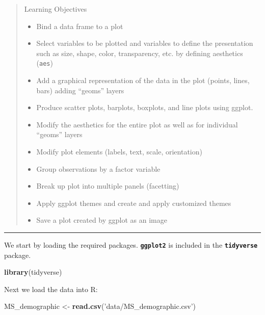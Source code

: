 \documentclass[]{book}
\newenvironment{Shaded}{\begin{snugshade}}{\end{snugshade}}
\newcommand{\KeywordTok}[1]{\textcolor[rgb]{0.13,0.29,0.53}{\textbf{#1}}}
\newcommand{\StringTok}[1]{\textcolor[rgb]{0.31,0.60,0.02}{#1}}
\newcommand{\NormalTok}[1]{#1}
\providecommand{\tightlist}{%
  \setlength{\itemsep}{0pt}\setlength{\parskip}{0pt}}
\theoremstyle{definition}
\theoremstyle{definition}
\theoremstyle{definition}
\theoremstyle{remark}
\begin{document}
\begin{quote}
Learning Objectives

\begin{itemize}
\tightlist
\item
  Bind a data frame to a plot
\item
  Select variables to be plotted and variables to define the
  presentation such as size, shape, color, transparency, etc. by
  defining aesthetics (\texttt{aes})
\item
  Add a graphical representation of the data in the plot (points, lines,
  bars) adding ``geoms'' layers
\item
  Produce scatter plots, barplots, boxplots, and line plots using
  ggplot.
\item
  Modify the aesthetics for the entire plot as well as for individual
  ``geoms'' layers
\item
  Modify plot elements (labels, text, scale, orientation)
\item
  Group observations by a factor variable
\item
  Break up plot into multiple panels (facetting)
\item
  Apply ggplot themes and create and apply customized themes
\item
  Save a plot created by ggplot as an image
\end{itemize}
\end{quote}

\begin{center}\rule{0.5\linewidth}{\linethickness}\end{center}

We start by loading the required packages. \textbf{\texttt{ggplot2}} is
included in the \textbf{\texttt{tidyverse}} package.

\begin{Shaded}
\begin{Highlighting}[]
\KeywordTok{library}\NormalTok{(tidyverse)}
\end{Highlighting}
\end{Shaded}

Next we load the data into R:

\begin{Shaded}
\begin{Highlighting}[]
\NormalTok{MS_demographic <-}\StringTok{ }\KeywordTok{read.csv}\NormalTok{(}\StringTok{'data/MS_demographic.csv'}\NormalTok{)}
\end{Highlighting}
\end{Shaded}
\end{document}
